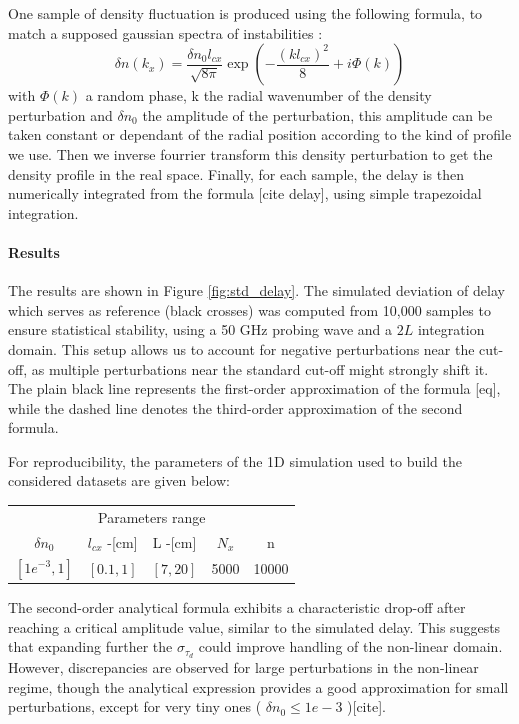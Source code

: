 \documentclass[11pt,openany]{report}
\begin{document}
\begin{multicols}{2}
    One sample of density fluctuation is produced using the following formula, to match a supposed gaussian spectra of instabilities :
    $$\delta n(k_x) = \frac{\delta n_0 l_{cx}}{\sqrt{8\pi}} \exp\left(-\frac{(kl_{cx})^2}{8} + i\Phi(k)\right)$$
    with $\Phi(k)$ a random phase, k the radial wavenumber of the density perturbation and $\delta n_0$ the amplitude of the perturbation, this amplitude can be taken constant or dependant of the radial position according to the kind of profile we use. Then we inverse fourrier transform this density perturbation to get the density profile in the real space. Finally, for each sample, the delay is then numerically integrated from the formula [cite delay], using simple trapezoidal integration.
    \paragraph*{Results}
    The results are shown in Figure \ref{fig:std_delay}. The simulated deviation of delay which serves as reference (black crosses) was computed from 10,000 samples to ensure statistical stability, using a 50 GHz probing wave and a $2L$ integration domain. This setup allows us to account for negative perturbations near the cut-off, as multiple perturbations near the standard cut-off might strongly shift it. The plain black line represents the first-order approximation of the formula [eq], while the dashed line denotes the third-order approximation of the second formula.

    For reproducibility, the parameters of the 1D simulation used to build the considered datasets are given below:
    \setlength{\tabcolsep}{.038\linewidth}
    \renewcommand{\arraystretch}{1.5}
    \begin{center}
        \begin{tabular}{ccccc}
            \toprule
            \multicolumn{5}{c}{Parameters range}                       \\
            \cmidrule{1 -5}
            $\delta n_0$   & $l_{cx}$ -[cm] & L -[cm]  & $N_x$ & n     \\
            \midrule
            $[1e^{-3}, 1]$ & $[0.1,1]$      & $[7,20]$ & 5000  & 10000 \\
            \bottomrule
        \end{tabular}
    \end{center}


    The second-order analytical formula exhibits a characteristic drop-off after reaching a critical amplitude value, similar to the simulated delay. This suggests that expanding further the $\sigma_{\tau_d}$ could improve handling of the non-linear domain. However, discrepancies are observed for large perturbations in the non-linear regime, though the analytical expression provides a good approximation for small perturbations, except for very tiny ones ( $ \delta n_0 \leq 1e-3$ )[cite].


\end{multicols}
\end{document}
